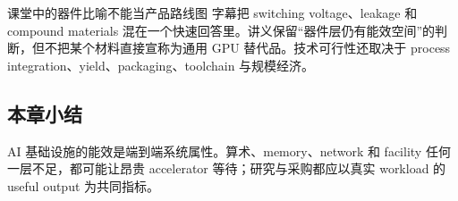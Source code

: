 \begin{warningbox}{课堂中的器件比喻不能当产品路线图}
字幕把 switching voltage、leakage 和 compound materials 混在一个快速回答里。讲义保留“器件层仍有能效空间”的判断，但不把某个材料直接宣称为通用 GPU 替代品。技术可行性还取决于 process integration、yield、packaging、toolchain 与规模经济。
\end{warningbox}

\subsection{本章小结}

AI 基础设施的能效是端到端系统属性。算术、memory、network 和 facility 任何一层不足，都可能让昂贵 accelerator 等待；研究与采购都应以真实 workload 的 useful output 为共同指标。

